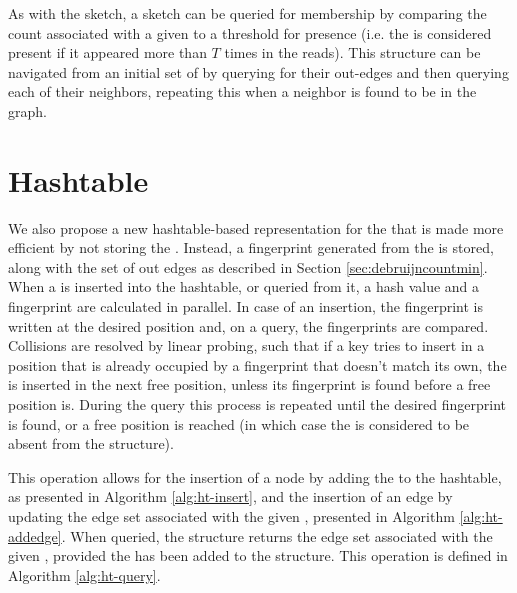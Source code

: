 As with the \cm sketch, a \dBCM sketch can be queried for membership by comparing the count associated with a given \kmer to a threshold
for presence (i.e. the \kmer is considered present if it appeared more than $T$ times in the reads). This structure can be navigated from
an initial set of \kmers by querying for their out-edges and then querying each of their neighbors, repeating this when a neighbor is
found to be in the graph. 

\section{Hashtable}
\label{sec:debruijnhashtable}

We also propose a new hashtable-based representation for the \dBG that is made more efficient by not storing the \kmer. Instead,
a fingerprint generated from the \kmer is stored, along with the set of out edges as described in Section \ref{sec:debruijncountmin}.
When a \kmer is inserted into the hashtable, or queried from it, a hash value and a fingerprint are calculated in parallel.
In case of an insertion, the fingerprint is written at the desired position and, on a query, the fingerprints are compared. Collisions
are resolved by linear probing, such that if a key tries to insert in a position that is already occupied by a fingerprint that doesn't 
match its own, the \kmer is inserted in the next free position, unless its fingerprint is found before a free position is. During the
query this process is repeated until the desired fingerprint is found, or a free position is reached (in which case the \kmer is
considered to be absent from the structure).

This operation allows for the insertion of a node by adding the \kmer to the hashtable, as presented in Algorithm \ref{alg:ht-insert},
and the insertion of an edge by updating the edge set associated with the given \kmer, presented in Algorithm \ref{alg:ht-addedge}.
When queried, the structure returns the edge set associated with the given \kmer, provided the \kmer has been added to the structure.
This operation is defined in Algorithm \ref{alg:ht-query}.


